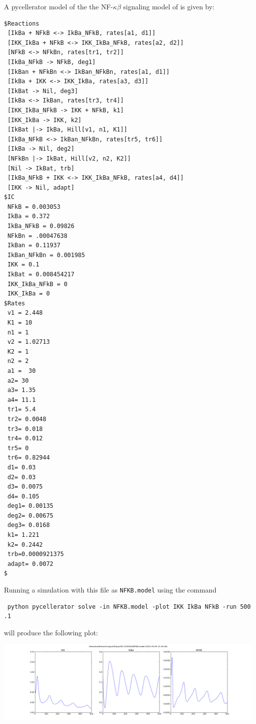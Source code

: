 A pycellerator model of the the  NF-$\kappa\beta$ signaling model of \cite{NFKB} is given by:


\begin{lstlisting}
$Reactions
 [IkBa + NFkB <-> IkBa_NFkB, rates[a1, d1]]
 [IKK_IkBa + NFkB <-> IKK_IkBa_NFkB, rates[a2, d2]]
 [NFkB <-> NFkBn, rates[tr1, tr2]]
 [IkBa_NFkB -> NFkB, deg1]
 [IkBan + NFkBn <-> IkBan_NFkBn, rates[a1, d1]] 
 [IkBa + IKK <-> IKK_IkBa, rates[a3, d3]]
 [IkBat -> Nil, deg3]
 [IkBa <-> IkBan, rates[tr3, tr4]]
 [IKK_IkBa_NFkB -> IKK + NFkB, k1] 
 [IKK_IkBa -> IKK, k2]
 [IkBat |-> IkBa, Hill[v1, n1, K1]]
 [IkBa_NFkB <-> IkBan_NFkBn, rates[tr5, tr6]]
 [IkBa -> Nil, deg2]
 [NFkBn |-> IkBat, Hill[v2, n2, K2]] 
 [Nil -> IkBat, trb]
 [IkBa_NFkB + IKK <-> IKK_IkBa_NFkB, rates[a4, d4]] 
 [IKK -> Nil, adapt]
$IC
 NFkB = 0.003053
 IkBa = 0.372
 IkBa_NFkB = 0.09826
 NFkBn = .00047638
 IkBan = 0.11937
 IkBan_NFkBn = 0.001985
 IKK = 0.1
 IkBat = 0.008454217
 IKK_IkBa_NFkB = 0
 IKK_IkBa = 0
$Rates
 v1 = 2.448
 K1 = 10
 n1 = 1
 v2 = 1.02713
 K2 = 1
 n2 = 2
 a1 =  30 
 a2= 30
 a3= 1.35
 a4= 11.1
 tr1= 5.4 
 tr2= 0.0048
 tr3= 0.018
 tr4= 0.012
 tr5= 0
 tr6= 0.82944
 d1= 0.03 
 d2= 0.03
 d3= 0.0075
 d4= 0.105
 deg1= 0.00135 
 deg2= 0.00675 
 deg3= 0.0168
 k1= 1.221
 k2= 0.2442 
 trb=0.0000921375
 adapt= 0.0072
$
\end{lstlisting}

Running a simulation with this file as {\tt NFKB.model} using the command
\begin{lstlisting}
 python pycellerator solve -in NFKB.model -plot IKK IkBa NFkB -run 500 .1
\end{lstlisting}


will produce the following plot:

\begin{center}
\includegraphics[width=\textwidth]{NFKB.png}
\end{center}

